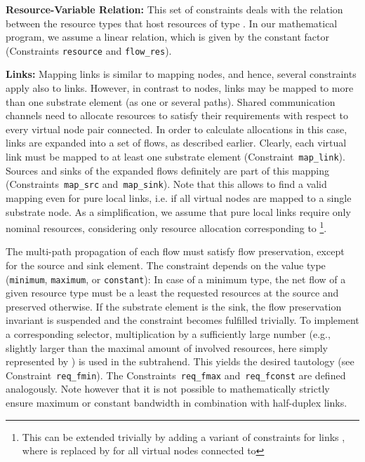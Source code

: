 \documentclass[conference,10pt]{IEEEtran}
\begin{document}
\begin{description*}
\item \textbf{Resource-Variable Relation:} This set of constraints deals with the
  relation between the resource types  that host resources of type .
  In our mathematical program, we assume a linear relation, which is given by
  the constant factor  (Constraints \texttt{resource} and \texttt{flow\_res}).
\item \textbf{Links:} Mapping links is similar to mapping nodes, and hence, several
  constraints apply also to links.
  However, in contrast to nodes, links may be mapped to more than one substrate element (as one or several paths).
  Shared communication channels need to allocate resources to satisfy their requirements with respect to every virtual node pair connected.
  In order to calculate allocations in this case, links are expanded into a set of flows, as described earlier.
  Clearly, each virtual link must be mapped to at least one substrate element
  (Constraint~\texttt{map\_link}).
  Sources and sinks of the expanded flows definitely are part of this mapping
(Constraints~\texttt{map\_src} and~\texttt{map\_sink}).
  Note that this allows to find a valid mapping even for pure local links, i.e. if all virtual nodes are mapped to a single substrate node.
  As a simplification, we assume that pure local links require only nominal resources, considering only resource allocation corresponding to \footnote{This can be extended trivially by adding a variant of constraints  for links , where  is replaced by  for all virtual nodes  connected to }.

  The multi-path propagation of each flow  must satisfy flow preservation,
  except for the source and sink element. The constraint depends on the
  value type (\texttt{minimum}, \texttt{maximum}, or \texttt{constant}): In
  case of a minimum type, the net flow of a given resource type must be a
  least the requested resources at the source and preserved otherwise. If the
  substrate element is the sink, the flow preservation invariant is suspended
  and the constraint becomes fulfilled trivially. To implement a corresponding
  selector, multiplication by a sufficiently large number (e.g., slightly larger than
  the maximal amount of involved resources, here simply represented by ) is used in the subtrahend.
  This yields the desired tautology (see Constraint~\texttt{req\_fmin}). The
  Constraints~\texttt{req\_fmax} and~\texttt{req\_fconst} are defined analogously.
 Note however that it is not possible to mathematically strictly ensure maximum or constant bandwidth in combination with half-duplex links.


\end{description*}
\end{document}

